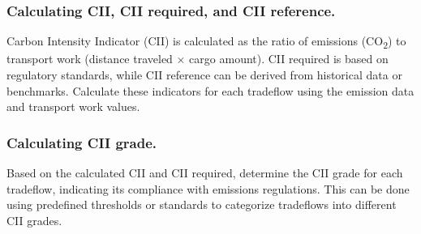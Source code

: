 \subsubsection{Calculating CII, CII required, and CII reference.}

Carbon Intensity Indicator (CII) is calculated as the ratio of emissions (CO\textsubscript{2}) to transport work (distance traveled $\times$ cargo amount). CII required is based on regulatory standards, while CII reference can be derived from historical data or benchmarks. Calculate these indicators for each tradeflow using the emission data and transport work values.

\subsubsection{Calculating CII grade.}

Based on the calculated CII and CII required, determine the CII grade for each tradeflow, indicating its compliance with emissions regulations. This can be done using predefined thresholds or standards to categorize tradeflows into different CII grades.

